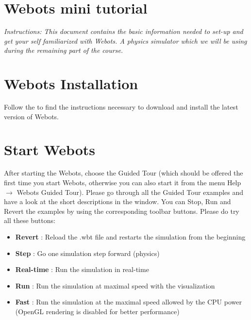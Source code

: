 \documentclass{cmc}
\begin{document}
\pagestyle{fancy}
 

\section*{Webots mini tutorial}

\textit{Instructions: This document contains the basic information
  needed to set-up and get your self familiarized with Webots.  A
  physics simulator which we will be using during the remaining part
  of the course.}

\section{Webots Installation}
\label{sec:webots-installation}

Follow the
\href{https://www.cyberbotics.com/#download}{}
to find the instructions necessary to download and install
the latest version of Webots.

\section{Start Webots}
\label{sec:start-webots}

After starting the Webots, choose the Guided Tour (which should be
offered the first time you start Webots, otherwise you can also start
it from the menu Help $\rightarrow$ Webots Guided Tour). Please go
through all the Guided Tour examples and have a look at the short
descriptions in the window. You can Stop, Run and Revert the examples
by using the corresponding toolbar buttons. Please do try all these
buttons:
\begin{itemize}
\item \textbf{Revert} : Reload the .wbt file and restarts the
  simulation from the beginning
\item \textbf{Step} : Go one simulation step forward (physics)
\item \textbf{Real-time} : Run the simulation in real-time
\item \textbf{Run} : Run the simulation at maximal speed with the
  visualization
\item \textbf{Fast} : Run the simulation at the maximal speed allowed
  by the CPU power (OpenGL rendering is disabled for better
  performance)
\end{itemize}
\end{document}
